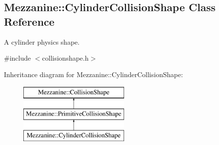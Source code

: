 \hypertarget{classMezzanine_1_1CylinderCollisionShape}{
\subsection{Mezzanine::CylinderCollisionShape Class Reference}
\label{classMezzanine_1_1CylinderCollisionShape}
}


A cylinder physics shape.  




{\ttfamily \#include $<$collisionshape.h$>$}

Inheritance diagram for Mezzanine::CylinderCollisionShape:\begin{figure}[H]
\begin{center}
\leavevmode
\includegraphics[height=3.000000cm]{classMezzanine_1_1CylinderCollisionShape}
\end{center}
\end{figure}
